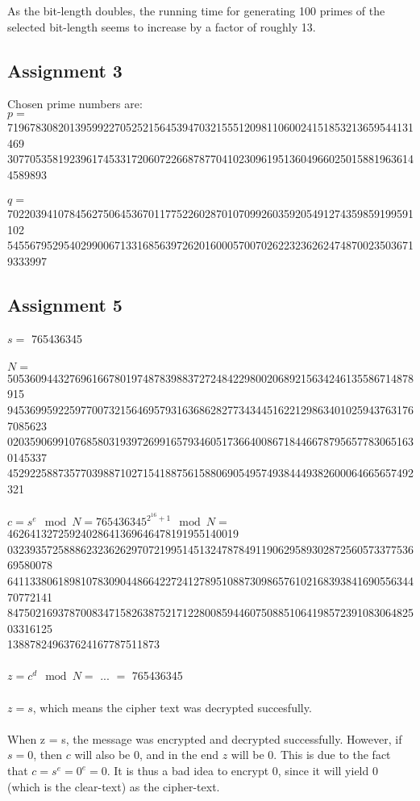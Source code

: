 \documentclass[11pt,a4paper]{article}
\begin{document}
As the bit-length doubles, the running time for generating 100 primes of the selected bit-length seems to increase by a factor of roughly 13.

\subsection{Assignment 3}
Chosen prime numbers are: \\
$p = $ 719678308201395992270525215645394703215551209811060024151853213659544131469\\3077053581923961745331720607226687877041023096195136049660250158819636144589893\\\\
$q = $ 702203941078456275064536701177522602870107099260359205491274359859199591102\\5455679529540299006713316856397262016000570070262232362624748700235036719333997
\subsection{Assignment 5}
$s = $ 765436345
\\\\$N =$ 505360944327696166780197487839883727248422980020689215634246135586714878915\\9453699592259770073215646957931636862827734344516221298634010259437631767085623\\0203590699107685803193972699165793460517366400867184466787956577830651630145337\\452922588735770398871027154188756158806905495749384449382600064665657492321 
\\\\$c = s^e\mod N = 765436345^{2^{16}+1} \mod N = $ 46264132725924028641369646478191955140019\\03239357258886232362629707219951451324787849119062958930287256057337753669580078\\64113380618981078309044866422724127895108873098657610216839384169055634470772141\\84750216937870083471582638752171228008594460750885106419857239108306482503316125\\138878249637624167787511873
\\\\$z = c^d\mod N = $ ... $ = $ 765436345
\\\\$z = s$, which means the cipher text was decrypted succesfully.
\\\\ 
When z = s, the message was encrypted and decrypted successfully. However, if $s = 0$, then $c$ will also be $0$, and in the end $z$ will be $0$. This is due to the fact that $c = s^e = 0^e = 0$. It is thus a bad idea to encrypt $0$, since it will yield $0$ (which is the clear-text) as the cipher-text.
\end{document}
